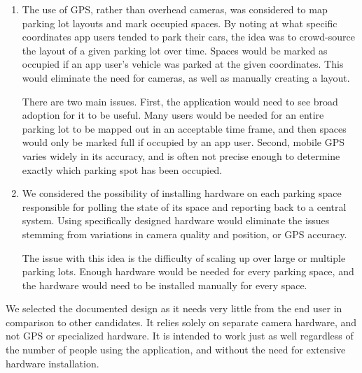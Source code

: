 \documentclass[12pt, titlepage]{article}
\begin{document}
\begin{enumerate}
  \begin{enumerate}
  \item The use of GPS, rather than overhead cameras, was considered to map
  parking lot layouts and mark occupied spaces. By noting at what specific
  coordinates app users tended to park their cars, the idea was to crowd-source
  the layout of a given parking lot over time. Spaces would be marked as
  occupied if an app user's vehicle was parked at the given coordinates. This
  would eliminate the need for cameras, as well as manually creating a layout.

  There are two main issues. First, the application would need to see broad
  adoption for it to be useful. Many users would be needed for an entire parking
  lot to be mapped out in an acceptable time frame, and then spaces would only
  be marked full if occupied by an app user. Second, mobile GPS varies widely in
  its accuracy, and is often not precise enough to determine exactly which
  parking spot has been occupied.

  \item We considered the possibility of installing hardware on each parking
  space responsible for polling the state of its space and reporting back to a
  central system. Using specifically designed hardware would eliminate the
  issues stemming from variations in camera quality and position, or GPS
  accuracy.

  The issue with this idea is the difficulty of scaling up over large or
  multiple parking lots. Enough hardware would be needed for every parking
  space, and the hardware would need to be installed manually for every space.
  \end{enumerate}
  We selected the documented design as it needs very little from the end user in
  comparison to other candidates. It relies solely on separate camera hardware,
  and not GPS or specialized hardware. It is intended to work just as well
  regardless of the number of people using the application, and without the need
  for extensive hardware installation.
\end{enumerate}
\end{document}
